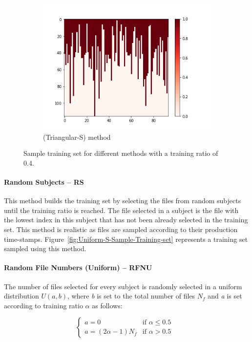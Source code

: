 \documentclass[10pt, conference, compsocconf]{IEEEtran}
\begin{document}
\begin{figure}[h!]
\begin{subfigure}[b]{0.4\linewidth}
  		\includegraphics[width=\columnwidth]{figures/5vs7_random-triangular-smallest_04_training}
  		\caption{(Triangular-S) method}
  		\label{fig:triangular-S-Sample-Training-set}
	\end{subfigure}
	\caption{Sample training set for different methods with a training ratio of 0.4.}		
\end{figure}

\paragraph{Random Subjects -- RS} This method builds the 
training set by selecting the files from random subjects 
until the training ratio is reached. The file selected in a 
subject is the file with the lowest index in this subject that has not 
been already selected in the training set. This method is realistic as 
files are sampled according to their production time-stamps. 
Figure~\ref{fig:Uniform-S-Sample-Training-set} represents a training 
set sampled using this method.

\paragraph{Random File Numbers (Uniform) -- RFNU}

The number of files selected for every subject is randomly selected in
a uniform distribution $U(\textit{a},\textit{b})$, where \textit{b} is set to the total
number of files $N_{f}$ and \textit{a} is set according to training ratio $\alpha$ as follows:

\[
  \begin{cases}
          \textit{a} = 0      & \text{if $\alpha \leq 0.5$ }\\
          
          \textit{a} = (2\alpha - 1) N_{f} & \text{if $\alpha > 0.5$}
  \end{cases}
\]
\end{document}
